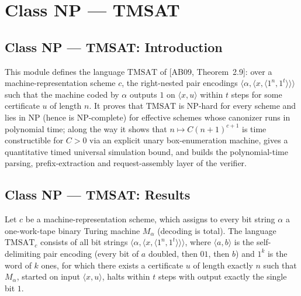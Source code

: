 \section{Class NP --- TMSAT}
\subsection*{Class NP --- TMSAT: Introduction}

This module defines the language $\mathrm{TMSAT}$ of [AB09, Theorem~2.9]: over a
machine-representation scheme $c$, the right-nested pair encodings
$\langle\alpha,\langle x,\langle 1^n,1^t\rangle\rangle\rangle$ such that the machine coded by
$\alpha$ outputs $1$ on $\langle x,u\rangle$ within $t$ steps for some certificate $u$ of length
$n$. It proves that $\mathrm{TMSAT}$ is $\mathrm{NP}$-hard for every scheme and lies in
$\mathrm{NP}$ (hence is $\mathrm{NP}$-complete) for effective schemes whose canonizer runs in
polynomial time; along the way it shows that $n \mapsto C(n+1)^{c+1}$ is time constructible for
$C > 0$ via an explicit unary box-enumeration machine, gives a quantitative timed universal
simulation bound, and builds the polynomial-time parsing, prefix-extraction and request-assembly
layer of the verifier.

\subsection*{Class NP --- TMSAT: Results}

\begin{definition}
\label{Complexity.TMSAT}
\leanok
{}
Let $c$ be a machine-representation scheme, which assigns to every bit string $\alpha$ a one-work-tape binary Turing machine $M_\alpha$ (decoding is total). The language $\mathrm{TMSAT}_c$ consists of all bit strings $\langle\alpha,\langle x,\langle 1^n,1^t\rangle\rangle\rangle$, where $\langle a,b\rangle$ is the self-delimiting pair encoding (every bit of $a$ doubled, then $01$, then $b$) and $1^k$ is the word of $k$ ones, for which there exists a certificate $u$ of length exactly $n$ such that $M_\alpha$, started on input $\langle x,u\rangle$, halts within $t$ steps with output exactly the single bit $1$.
\end{definition}

